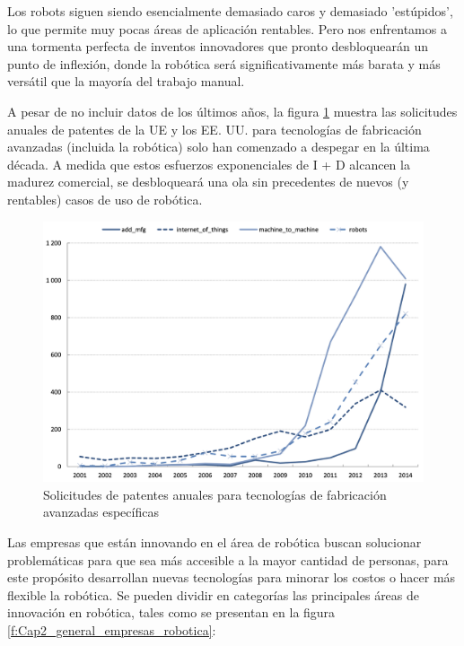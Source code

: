             \newpage
    
    Los robots siguen siendo esencialmente demasiado caros y demasiado 'estúpidos', lo que permite muy pocas áreas de aplicación rentables. Pero nos enfrentamos a una tormenta perfecta de inventos innovadores que pronto desbloquearán un punto de inflexión, donde la robótica será significativamente más barata y más versátil que la mayoría del trabajo manual.
    
     A pesar de no incluir datos de los últimos años, la figura \ref{f:Cap2_general_solicitud_patentes} muestra las solicitudes anuales de patentes de la UE y los EE. UU. para tecnologías de fabricación avanzadas (incluida la robótica) solo han comenzado a despegar en la última década. A medida que estos esfuerzos exponenciales de I + D alcancen la madurez comercial, se desbloqueará una ola sin precedentes de nuevos (y rentables) casos de uso de robótica. 
     
    \begin{figure}[H]
        \centering
        \includegraphics[width=1\linewidth]{Main/Chapter2/Images2/solicitud-patentes.png}
        \caption{Solicitudes de patentes anuales para tecnologías de fabricación avanzadas específicas \cite{dd98ff58}}
        \label{f:Cap2_general_solicitud_patentes}
    \end{figure}

 
    Las empresas que están innovando en el área de robótica buscan solucionar problemáticas para que sea más accesible a la mayor cantidad de personas, para este propósito desarrollan nuevas tecnologías para minorar los costos o hacer más flexible la robótica. Se pueden dividir en categorías las principales áreas de innovación en robótica, tales como se presentan en la figura \ref{f:Cap2_general_empresas_robotica}:

